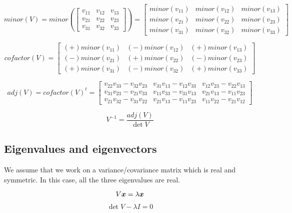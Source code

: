 \documentclass{article}
\newcommand{\bm}[1]{\mbox{\boldmath$#1$}}
\begin{document}
$$
minor(V) =
minor(
\left[\begin{array}{ccc}
 v_{11} & v_{12} & v_{13} \\
 v_{21} & v_{22} & v_{23} \\
 v_{31} & v_{32} & v_{33}
\end{array}\right])
=
\left[\begin{array}{ccc}
 minor(v_{11}) & minor(v_{12}) & minor(v_{13}) \\
 minor(v_{21}) & minor(v_{22}) & minor(v_{23}) \\
 minor(v_{31}) & minor(v_{32}) & minor(v_{33})
\end{array}\right]
$$

$$
cofactor(V)
=
\left[\begin{array}{ccc}
 (+)minor(v_{11}) & (-)minor(v_{12}) & (+)minor(v_{13}) \\
 (-)minor(v_{21}) & (+)minor(v_{22}) & (-)minor(v_{23}) \\
 (+)minor(v_{31}) & (-)minor(v_{32}) & (+)minor(v_{33})
\end{array}\right]
$$


$$
adj(V) = cofactor(V)^t
=
\left[\begin{array}{ccc}
 v_{22}v_{33} - v_{32}v_{23} &
 v_{31}v_{13} - v_{12}v_{33} &
 v_{12}v_{23} - v_{22}v_{13} \\
 v_{31}v_{23} - v_{21}v_{33} &
 v_{11}v_{33} - v_{31}v_{13} &
 v_{21}v_{13} - v_{11}v_{23} \\
 v_{21}v_{32} - v_{31}v_{22} &
 v_{21}v_{13} - v_{11}v_{23} &
 v_{11}v_{22} - v_{21}v_{12}
\end{array}\right]
$$

$$
V^{-1}
=
\frac{adj(V)}{\det V}
$$


\subsection{Eigenvalues and eigenvectors}

We assume that we work on a variance/covariance matrix which is real and 
symmetric. In this case, all the three eigenvalues are real.

$$
V \bm{x} = \lambda \bm{x}
$$

$$
\det V - \lambda I = 0
$$
\end{document}
